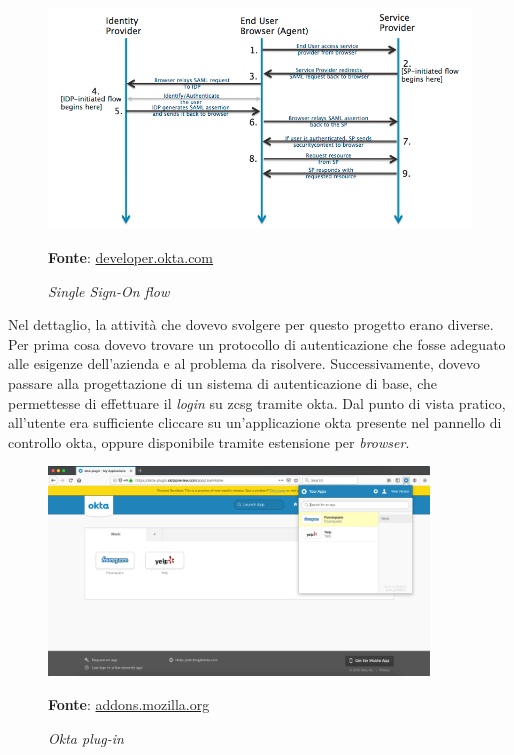     \begin{figure}[ht]
        \centering
        \includegraphics[width=1\textwidth]{immagini/sso_flow.png}
        \caption{\textit{Single Sign-On flow}}
        \textbf{Fonte}:
        \href{https://developer.okta.com/docs/concepts/saml/#federated-identity}{developer.okta.com}
        \label{fig: Single Sign-On flow}
    \end{figure}
Nel dettaglio, la attività che dovevo svolgere per questo progetto erano diverse. Per prima cosa dovevo trovare un protocollo di autenticazione che fosse adeguato alle esigenze dell'azienda e al problema da risolvere. Successivamente, dovevo passare alla progettazione di un sistema di autenticazione di base, che permettesse di effettuare il \textit{login} su \gls{zcsg} tramite \gls{okta}. Dal punto di vista pratico, all'utente era sufficiente cliccare su un'applicazione \gls{okta} presente nel pannello di controllo \gls{okta}, oppure disponibile tramite estensione per \textit{browser}.
\newpage
    \begin{figure}[ht]
        \centering
        \includegraphics[width=0.9\textwidth]{immagini/okta_plugin.png}
        \caption{\textit{Okta plug-in}}
        \textbf{Fonte}:
        \href{https://addons.mozilla.org/en-US/firefox/addon/okta-browser-plugin/}{addons.mozilla.org}
        \label{fig: Okta plug-in}
    \end{figure}
    
